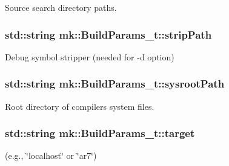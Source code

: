 Source search directory paths. 

\subsubsection[{\texorpdfstring{strip\+Path}{stripPath}}]{\setlength{\rightskip}{0pt plus 5cm}std\+::string mk\+::\+Build\+Params\+\_\+t\+::strip\+Path}\hypertarget{structmk_1_1_build_params__t_ae0c640cc9d58c880d0f3eafc888fb779}{}\label{structmk_1_1_build_params__t_ae0c640cc9d58c880d0f3eafc888fb779}


Debug symbol stripper (needed for -\/d option) 

\subsubsection[{\texorpdfstring{sysroot\+Path}{sysrootPath}}]{\setlength{\rightskip}{0pt plus 5cm}std\+::string mk\+::\+Build\+Params\+\_\+t\+::sysroot\+Path}\hypertarget{structmk_1_1_build_params__t_aa6b880797125853252b8336ffb47e35e}{}\label{structmk_1_1_build_params__t_aa6b880797125853252b8336ffb47e35e}


Root directory of compiler\textquotesingle{}s system files. 

\subsubsection[{\texorpdfstring{target}{target}}]{\setlength{\rightskip}{0pt plus 5cm}std\+::string mk\+::\+Build\+Params\+\_\+t\+::target}\hypertarget{structmk_1_1_build_params__t_af772341ef408fe56158a5099253fb4c0}{}\label{structmk_1_1_build_params__t_af772341ef408fe56158a5099253fb4c0}


(e.\+g., \char`\"{}localhost\char`\"{} or \char`\"{}ar7\char`\"{}) 

